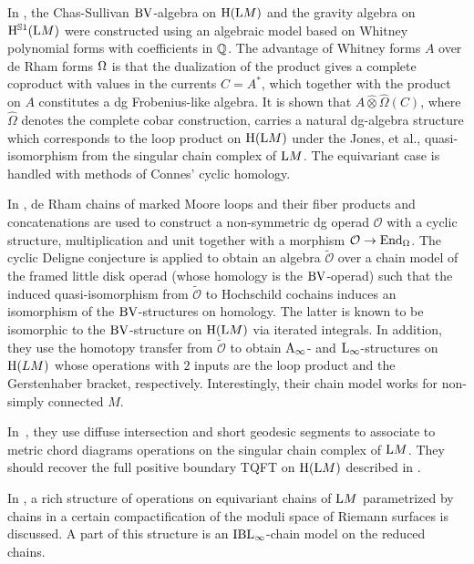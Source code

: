 \documentclass[\MainFolder/Text.tex]{subfiles}
\begin{document}
In \cite{Chen2012}, the Chas-Sullivan $\mathrm{BV}$-algebra on $\mathrm{H}(\mathrm{L} M)$ and the gravity algebra on $\mathrm{H}^{\mathbb{S}{1}}(\mathrm{L} M)$ were constructed using an algebraic model based on Whitney polynomial forms with coefficients in $\mathbb{Q}$.
The advantage of Whitney forms $A$ over de Rham forms $\Omega$ is that the dualization of the product gives a complete coproduct with values in the currents $C = A^*$, which together with the product on $A$ constitutes a dg Frobenius-like algebra.
It is shown that $A\hat{\otimes}\hat{\Omega}(C)$, where $\hat{\Omega}$ denotes the complete cobar construction, carries a natural dg-algebra structure which corresponds to the loop product on $\mathrm{H}(\mathrm{L} M)$ under the Jones, et al., quasi-isomorphism from the singular chain complex of $\mathrm{L} M$.
The equivariant case is handled with methods of Connes' cyclic homology.

In \cite{Irie2014}, de Rham chains of marked Moore loops and their fiber products and concatenations are used to construct a non-symmetric dg operad $\mathcal{O}$ with a cyclic structure, multiplication and unit together with a morphism $\mathcal{O}\to \mathrm{End}_\Omega$. The cyclic Deligne conjecture is applied to obtain an algebra $\widetilde{\mathcal{O}}$ over a chain model of the framed little disk operad (whose homology is the $\mathrm{BV}$-operad) such that the induced quasi-isomorphism from $\widetilde{\mathcal{O}}$ to Hochschild cochains induces an isomorphism of the $\mathrm{BV}$-structures on homology. The latter is known to be isomorphic to the $\mathrm{BV}$-structure on $\mathrm{H}(\mathrm{L} M)$ via iterated integrals.
In addition, they use the homotopy transfer from $\widetilde{\mathcal{O}}$ to obtain $\mathrm{A}_\infty$- and $\mathrm{L}_\infty$-structures on $\mathrm{H}(LM)$ whose operations with $2$ inputs are the loop product and the Gerstenhaber bracket, respectively.
Interestingly, their chain model works for non-simply connected $M$.


In~\cite{DrummondCole2015}, they use diffuse intersection and short geodesic segments to associate to metric chord diagrams operations on the singular chain complex of $\mathrm{L} M$.
They should recover the full positive boundary TQFT on $\mathrm{H}(\mathrm{L} M)$ described in \cite{Cohen2009}.

In \cite{Sullivan2005}, a rich structure of operations on equivariant chains of $\mathrm{L} M$ parametrized by chains in a certain compactification of the moduli space of Riemann surfaces is discussed. 
A part of this structure is an $\mathrm{IBL}_\infty$-chain model on the reduced chains.
\end{document}
